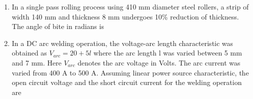 \documentclass[journal,11pt,onecolumn]{IEEEtran}
\begin{document}
\begin{enumerate}[resume]
    \item In a single pass rolling process using 410 mm diameter steel rollers, a strip of width 140 mm and thickness 8 mm undergoes 10\% reduction of thickness. The angle of bite in radians is

          \begin{enumerate}
          \end{enumerate}

    \item In a DC arc welding operation, the voltage-arc length characteristic was obtained as \(V_{arc} = 20 + 5l\) where the arc length l was varied between 5 mm and 7 mm. Here \(V_{arc}\) denotes the arc voltage in Volts. The arc current was varied from 400 A to 500 A. Assuming linear power source characteristic, the open circuit voltage and the short circuit current for the welding operation are
          \begin{enumerate}
          \end{enumerate}


\end{enumerate}
\end{document}
